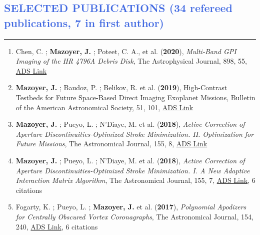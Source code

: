 \documentclass[11pt]{article}
\begin{document}
\vspace{-0.35cm}
\textcolor{RoyalBlue}{\section{SELECTED PUBLICATIONS (34 refereed publications, 7 in first author)}
\vspace{-0.25cm}\hrule}
\vspace{0.6cm}
\begin{enumerate}\itemsep 0pt


\item Chen, C. ; {\bf Mazoyer, J.} ; Poteet, C. A., et al. ({\bf2020}), {\it Multi-Band GPI Imaging of the HR 4796A Debris Disk}, The Astrophysical Journal, 898, 55, \href{https://ui.adsabs.harvard.edu/abs/2020ApJ...898...55C/abstract}{ADS Link}

\item {\bf Mazoyer, J.} ; Baudoz, P. ; Belikov, R. et al. ({\bf2019}), High-Contrast Testbeds for Future Space-Based Direct Imaging Exoplanet Missions, Bulletin of the American Astronomical Society, 51, 101, \href{https://ui.adsabs.harvard.edu/abs/2019BAAS...51g.101M/abstract}{ADS Link}


\item {\bf Mazoyer, J.} ; Pueyo, L. ; N'Diaye, M. et al. ({\bf2018}), {\it Active Correction of Aperture Discontinuities-Optimized Stroke Minimization. II. Optimization for Future Missions}, The Astronomical Journal, 155, 8, \href{https://ui.adsabs.harvard.edu/abs/2018AJ....155....8M/abstract}{ADS Link}

\item {\bf Mazoyer, J.} ; Pueyo, L. ; N'Diaye, M. et al. ({\bf2018}), {\it Active Correction of Aperture Discontinuities-Optimized Stroke Minimization. I. A New Adaptive Interaction Matrix Algorithm}, The Astronomical Journal, 155, 7, \href{https://ui.adsabs.harvard.edu/abs/2018AJ....155....7M/abstract}{ADS Link}, 6 citations

\item Fogarty, K. ; Pueyo, L. ; {\bf Mazoyer, J.} et al. ({\bf2017}), {\it Polynomial Apodizers for Centrally Obscured Vortex Coronagraphs}, The Astronomical Journal, 154, 240, \href{https://ui.adsabs.harvard.edu/abs/2017AJ....154..240F/abstract}{ADS Link}, 6 citations


\end{enumerate}
\end{document}
